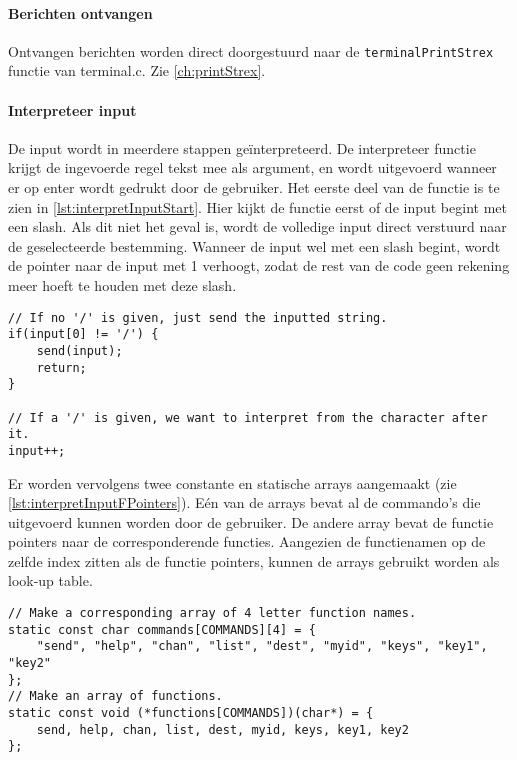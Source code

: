 \paragraph*{Berichten ontvangen} \label{ch:messageReceive}
Ontvangen berichten worden direct doorgestuurd naar de \texttt{terminalPrintStrex} functie van terminal.c. Zie \autoref{ch:printStrex}.

\paragraph*{Interpreteer input} \label{ch:interpreter}

De input wordt in meerdere stappen geïnterpreteerd. De interpreteer functie krijgt de ingevoerde regel tekst mee als argument, en wordt uitgevoerd wanneer er op enter wordt gedrukt door de gebruiker.
Het eerste deel van de functie is te zien in \autoref{lst:interpretInputStart}. Hier kijkt de functie eerst of de input begint met een slash. Als dit niet het geval is, wordt de volledige input direct verstuurd naar de geselecteerde bestemming. Wanneer de input wel met een slash begint, wordt de pointer naar de input met 1 verhoogt, zodat de rest van de code geen rekening meer hoeft te houden met deze slash.

\begin{lstlisting}[caption={Eerste deel van de interpreter},captionpos=b,label={lst:interpretInputStart},style=c,xleftmargin=.\textwidth,xrightmargin=.\textwidth]
// If no '/' is given, just send the inputted string.
if(input[0] != '/') {
    send(input);
    return;
}

// If a '/' is given, we want to interpret from the character after it.
input++;
\end{lstlisting}

Er worden vervolgens twee constante en statische arrays aangemaakt (zie \autoref{lst:interpretInputFPointers}). Eén van de arrays bevat al de commando's die uitgevoerd kunnen worden door de gebruiker. De andere array bevat de functie pointers naar de corresponderende functies.
Aangezien de functienamen op de zelfde index zitten als de functie pointers, kunnen de arrays gebruikt worden als look-up table.

\begin{lstlisting}[caption={De look-up table van de interpreter},captionpos=b,label={lst:interpretInputFPointers},style=c,xleftmargin=.\textwidth,xrightmargin=.\textwidth]
// Make a corresponding array of 4 letter function names.
static const char commands[COMMANDS][4] = {
    "send", "help", "chan", "list", "dest", "myid", "keys", "key1", "key2"
};
// Make an array of functions.
static const void (*functions[COMMANDS])(char*) = {
    send, help, chan, list, dest, myid, keys, key1, key2
};
\end{lstlisting}


